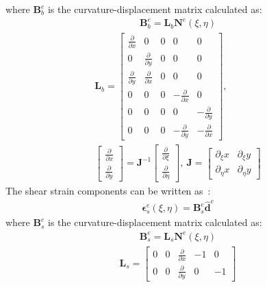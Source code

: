 \documentclass[materials,article,submit,moreauthors,pdftex]{Definitions/mdpi}
\begin{document}
where \(\textbf{B}_b^e\) is the curvature-displacement matrix calculated as:
\begin{eqnarray}
\textbf{B}_b^e=\textbf{L}_b\textbf{N}^e(\xi,\eta)
\end{eqnarray}
\begin{eqnarray}
\textbf{L}_b=\left [
\begin{array}{ccccc}
\frac{\partial }{\partial x} & 0 & 0 & 0 & 0\\
0 & \frac{\partial }{\partial y} & 0 & 0 & 0\\
\frac{\partial }{\partial y} & \frac{\partial }{\partial x} & 0 & 0 & 0\\
0 & 0 & 0 & -\frac{\partial }{\partial x} & 0\\
0 & 0 & 0 & 0 & -\frac{\partial }{\partial y}\\
0 & 0 & 0 & -\frac{\partial }{\partial y} & -\frac{\partial }{\partial x}
\end{array} \right],\ \\
\left [
\begin{array}{c}
\frac{\partial }{\partial x}\\
\frac{\partial }{\partial y}
\end{array} \right] =\textbf{J}^{-1}
\left [
\begin{array}{c}
\frac{\partial }{\partial \xi}\\
\frac{\partial }{\partial \eta}
\end{array} \right], \ 
\textbf{J}=\left [
\begin{array}{cc}
\partial_\xi x & {\partial_\xi y} \\
\partial_\eta x & {\partial_\eta y}
\end{array} \right] \nonumber
\end{eqnarray}
The shear strain components can be written as~\cite{ferreira2008matlab}:
\begin{eqnarray}
\boldsymbol{\epsilon}_s^e(\xi,\eta)=\textbf{B}_s^e\widehat{\textbf{d}}^e
\end{eqnarray}
where \(\textbf{B}_s^e\) is the curvature-displacement matrix calculated as:
\begin{eqnarray}
\textbf{B}_s^e=\textbf{L}_s\textbf{N}^e(\xi,\eta)
\end{eqnarray}
\begin{eqnarray}
\textbf{L}_s=\left [
\begin{array}{ccccc}
0 & 0 & \frac{\partial }{\partial x} & -1 & 0 \\
0 & 0 & \frac{\partial }{\partial y} & 0 & -1
\end{array} \right]
\end{eqnarray}
\end{document}
